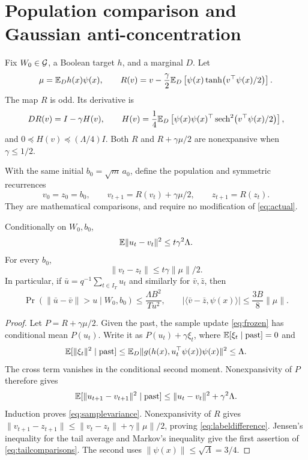 \documentclass[11pt,letterpaper,pmlr,twoside]{jmlr}
\newcommand{\ip}[2]{\langle #1,#2\rangle}\newcommand{\norm}[1]{\lVert #1\rVert}
\begin{document}
\section{Population comparison and Gaussian anti-concentration}
\label{app:null}
Fix $W_0\in\mathcal G$, a Boolean target $h$, and a marginal $D$. Let
\[
 \mu=\mathbb E_D h(x)\psi(x),\qquad
 R(v)=v-\frac\gamma2\mathbb E_D\left[\psi(x)\tanh\bigl(v^\top\psi(x)/2\bigr)\right].
\]
The map $R$ is odd. Its derivative is
\begin{equation}
 DR(v)=I-\gamma H(v),\qquad
 H(v)=\frac14\mathbb E_D\left[\psi(x)\psi(x)^\top
             \operatorname{sech}^2\bigl(v^\top\psi(x)/2\bigr)\right],
 \label{eq:H}
\end{equation}
and $0\preceq H(v)\preceq(\Lambda/4)I$. Both $R$ and $R+\gamma\mu/2$ are nonexpansive when $\gamma\le1/2$.

With the same initial $b_0=\sqrt m\,a_0$, define the population and symmetric recurrences
\begin{equation}
 v_0=z_0=b_0,
 \qquad v_{t+1}=R(v_t)+\gamma\mu/2,
 \qquad z_{t+1}=R(z_t).
 \label{eq:population}
\end{equation}
They are mathematical comparisons, and require no modification of \eqref{eq:actual}.

\begin{lemma}
\label{lem:population}
Conditionally on $W_0,b_0$,
\begin{equation}
 \E\norm{u_t-v_t}^2\le t\gamma^2\Lambda.
 \label{eq:samplevariance}
\end{equation}
For every $b_0$,
\begin{equation}
 \norm{v_t-z_t}\le t\gamma\norm\mu/2.
 \label{eq:labeldifference}
\end{equation}
In particular, if $\bar u=q^{-1}\sum_{t\in I_T}u_t$ and similarly for $\bar v,\bar z$, then
\begin{equation}
 \Pr(\norm{\bar u-\bar v}>u\mid W_0,b_0)
 \le\frac{\Lambda B^2}{Tu^2},
 \qquad
 |\ip{\bar v-\bar z}{\psi(x)}|\le\frac{3B}{8}\norm\mu.
 \label{eq:tailcomparisons}
\end{equation}
\end{lemma}
\begin{proof}
Let $P=R+\gamma\mu/2$. Given the past, the sample update \eqref{eq:frozen} has conditional mean $P(u_t)$. Write it as $P(u_t)+\gamma\xi_t$, where $\mathbb E[\xi_t\mid\text{past}]=0$ and
\[
 \E[\norm{\xi_t}^2\mid\text{past}]
 \le\E_D\norm{g(h(x),u_t^\top\psi(x))\psi(x)}^2\le\Lambda.
\]
The cross term vanishes in the conditional second moment. Nonexpansivity of $P$ therefore gives
\[
 \E[\norm{u_{t+1}-v_{t+1}}^2\mid\text{past}]
 \le\norm{u_t-v_t}^2+\gamma^2\Lambda.
\]
Induction proves \eqref{eq:samplevariance}. Nonexpansivity of $R$ gives
$\norm{v_{t+1}-z_{t+1}}\le\norm{v_t-z_t}+\gamma\norm\mu/2$, proving \eqref{eq:labeldifference}. Jensen's inequality for the tail average and Markov's inequality give the first assertion of \eqref{eq:tailcomparisons}. The second uses $\norm{\psi(x)}\le\sqrt\Lambda=3/4$.
\end{proof}
\end{document}
